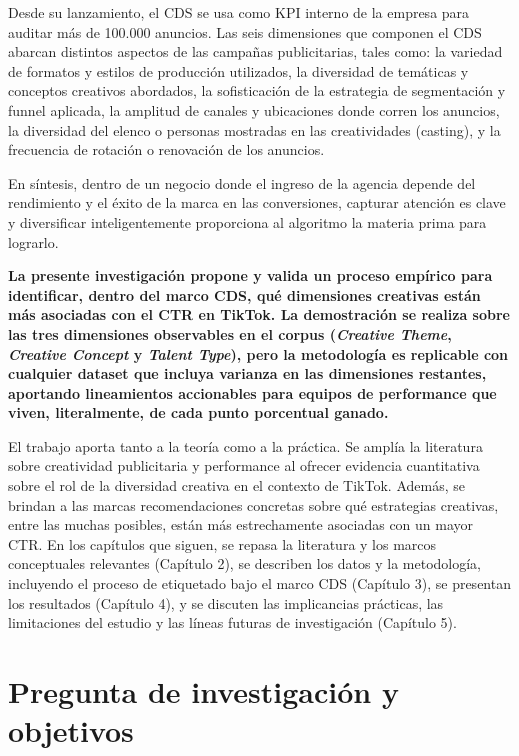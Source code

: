 \documentclass[12pt, a4paper]{report}
\begin{document}
Desde su lanzamiento, el CDS se usa como KPI interno de la empresa para auditar
más de 100.000 anuncios. Las seis dimensiones que componen el CDS abarcan
distintos aspectos de las campañas publicitarias, tales como: la variedad de
formatos y estilos de producción utilizados, la diversidad de temáticas y conceptos
creativos abordados, la sofisticación de la estrategia de segmentación y funnel
aplicada, la amplitud de canales y ubicaciones donde corren los anuncios, la
diversidad del elenco o personas mostradas en las creatividades (casting), y la
frecuencia de rotación o renovación de los anuncios.


En síntesis, dentro de un negocio donde el ingreso de la agencia depende del
rendimiento y el éxito de la marca en las conversiones, capturar atención es clave y
diversificar inteligentemente proporciona al algoritmo la materia prima para lograrlo.

\textbf{La presente investigación propone y valida un proceso empírico para identificar,
dentro del marco CDS, qué dimensiones creativas están más asociadas con el CTR en TikTok.
La demostración se realiza sobre las tres dimensiones observables en el corpus
(\textit{Creative Theme}, \textit{Creative Concept} y \textit{Talent Type}), pero la
metodología es replicable con cualquier dataset que incluya varianza en las dimensiones
restantes, aportando lineamientos accionables para equipos de performance que viven,
literalmente, de cada punto porcentual ganado.}

El trabajo aporta tanto a la teoría como a la práctica. Se amplía la literatura sobre
creatividad publicitaria y performance al ofrecer evidencia cuantitativa sobre el rol de
la diversidad creativa en el contexto de TikTok. Además, se brindan a las marcas
recomendaciones concretas sobre qué estrategias creativas, entre las muchas
posibles, están más estrechamente asociadas con un mayor CTR. En los capítulos que siguen, se repasa la literatura y los marcos conceptuales
relevantes (Capítulo 2), se describen los datos y la metodología, incluyendo el proceso
de etiquetado bajo el marco CDS (Capítulo 3), se presentan los resultados (Capítulo 4), 
y se discuten las implicancias prácticas, las limitaciones del estudio
y las líneas futuras de investigación (Capítulo 5).

\section{Pregunta de investigación y objetivos}
\end{document}
